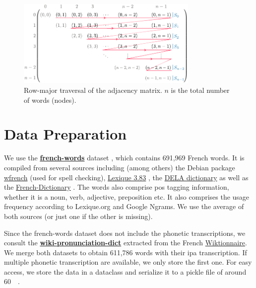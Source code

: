 \begin{figure}
    \centering
    \includegraphics[width=0.78\textwidth]{assets/illustrator/traverse-schema.pdf}
    \caption{Row-major traversal of the adjacency matrix. $n$ is the total number of words (\ie nodes).}
    \label{fig:traverse-schema}
\end{figure}

\section{Data Preparation}
\label{sec:data}

We use the \href{https://github.com/frodonh/french-words}{\textbf{french-words}} dataset \cite{data_french_words}, which contains 691,969 French words. It is compiled from several sources including (among others) the Debian package \href{https://packages.debian.org/fr/sid/wfrench}{wfrench} (used for spell checking), \href{http://www.lexique.org/}{Lexique 3.83} \cite{data_lexique}, the \href{https://infolingu.univ-mlv.fr/DonneesLinguistiques/Dictionnaires/telechargement.html}{DELA dictionary} \cite{data_dela} as well as the \href{https://github.com/hbenbel/French-Dictionary}{French-Dictionary} \cite{data_french_csv}. The words also comprise \acrfull{pos} tagging information, \eg whether it is a noun, verb, adjective, preposition etc. It also comprises the usage frequency according to Lexique.org and Google Ngrams. We use the average of both sources (or just one if the other is missing).

Since the french-words dataset does not include the phonetic transcriptions, we consult the \href{https://github.com/DanielSWolf/wiki-pronunciation-dict}{\textbf{wiki-pronunciation-dict}} \cite{data_pronunciation} extracted from the French \href{https://fr.wiktionary.org/}{Wiktionnaire}. We merge both datasets to obtain 611,786 words with their \gls{ipa} transcription. If multiple phonetic transcription are available, we only store the first one. For easy access, we store the data in a dataclass and serialize it to a pickle file of around \qty{60}{\mega\byte}.

